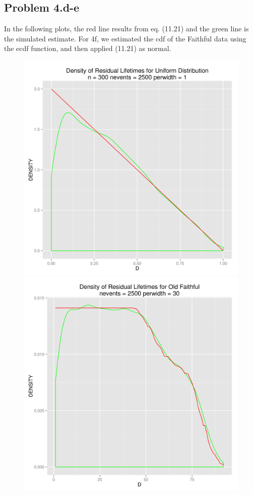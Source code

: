 \documentclass[letter]{article}
\begin{document}
\subsection*{Problem 4.d-e}
In the following plots, the red line results from eq. (11.21) and the green line
is the simulated estimate. For 4f, we estimated the cdf of the Faithful data using the ecdf function, and then applied (11.21) as normal.
\begin{figure}[H]
\centering
  \includegraphics[scale=0.5]{figures/4d.png}
  \includegraphics[scale=0.5]{figures/4e.png}
\end{figure}
\end{document}
